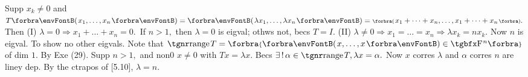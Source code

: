 %


Supp $x_k\neq 0$ and $T\Par{x_1,\dots,x_n}=\Par{\lambda x_1,\dots,\lambda x_n}=\BigPar{x_1+\dots+x_n,\dots,x_1+\dots+x_n}.$\parSol{}
Then (I) $\lambda=0\Rightarrow x_1+\dots+x_n=0.$ \,If $n>1,$ then $\lambda=0$ is eigval; othws not, becs $T=I.$\parSol{}
(II) $\lambda\neq 0\Rightarrow x_1=\dots=x_n\Rightarrow\lambda x_k=n x_k.$ Now $n$ is eigval.\PfEnd\vspace{2pt}\parSol{}
To show no other eigvals. \;Note that $\range T=\Bra{\Par{x,\dots,x}\in\FbbP{n}}$ of dim $1.$ By Exe (29).\PfEnd\parSol{}
\Or Supp $n>1,$ and non0 $x\neq0$ with $Tx=\lambda x.$ Becs $\exists\,!\,\alpha\in\range T,\lambda x=\alpha.$\parSol{}
Now $x$ corres $\lambda$ and $\alpha$ corres $n$ are liney dep. By the ctrapos of [5.10], $\lambda=n.$\PfEnd
\SepLine

